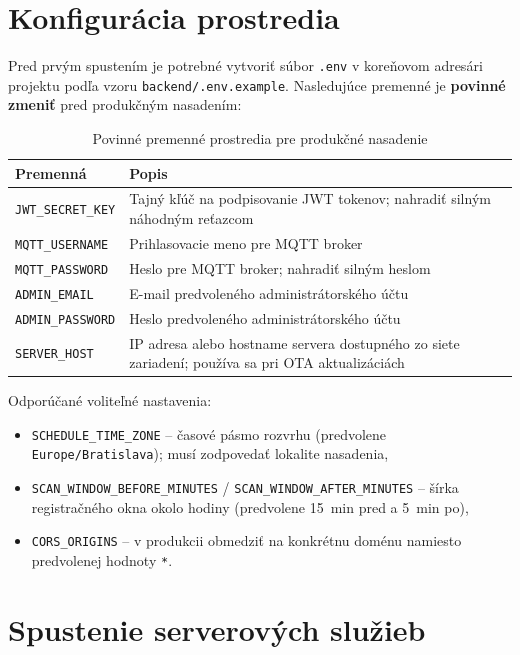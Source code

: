 \section{Konfigurácia prostredia}
\label{sec:deployment-env}

Pred prvým spustením je potrebné vytvoriť súbor \texttt{.env} v koreňovom adresári projektu podľa vzoru \texttt{backend/.env.example}. Nasledujúce premenné je \textbf{povinné zmeniť} pred produkčným nasadením:

\begin{table}[h!]
  \centering
  \caption{Povinné premenné prostredia pre produkčné nasadenie}
  \label{tab:env-vars}
  \begin{tabular}{lp{7.5cm}}
    \toprule
    Premenná & Popis \\
    \midrule
    \texttt{JWT\_SECRET\_KEY}   & Tajný kľúč na podpisovanie JWT tokenov; nahradiť silným náhodným reťazcom \\
    \texttt{MQTT\_USERNAME}     & Prihlasovacie meno pre MQTT broker \\
    \texttt{MQTT\_PASSWORD}     & Heslo pre MQTT broker; nahradiť silným heslom \\
    \texttt{ADMIN\_EMAIL}       & E-mail predvoleného administrátorského účtu \\
    \texttt{ADMIN\_PASSWORD}    & Heslo predvoleného administrátorského účtu \\
    \texttt{SERVER\_HOST}       & IP adresa alebo hostname servera dostupného zo siete zariadení; používa sa pri OTA aktualizáciách \\
    \bottomrule
  \end{tabular}
\end{table}

Odporúčané voliteľné nastavenia:

\begin{itemize}
    \item \texttt{SCHEDULE\_TIME\_ZONE} -- časové pásmo rozvrhu (predvolene \texttt{Europe/Bratislava}); musí zodpovedať lokalite nasadenia,
    \item \texttt{SCAN\_WINDOW\_BEFORE\_MINUTES} / \texttt{SCAN\_WINDOW\_AFTER\_MINUTES} -- šírka registračného okna okolo hodiny (predvolene 15~min pred a 5~min po),
    \item \texttt{CORS\_ORIGINS} -- v produkcii obmedziť na konkrétnu doménu namiesto predvolenej hodnoty \texttt{*}.
\end{itemize}

\section{Spustenie serverových služieb}
\label{sec:deployment-server}

